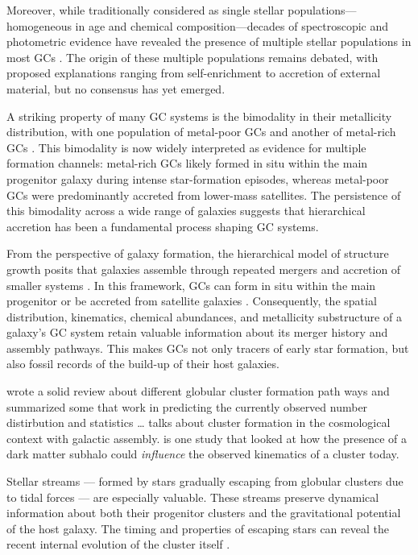     Moreover, while traditionally considered as single stellar populations—homogeneous in age and chemical composition—decades of spectroscopic and photometric evidence have revealed the presence of multiple stellar populations in most GCs \citep{2008MNRAS.391..825D,2012A&ARv..20...50G,2018ARA&A..56...83B}. The origin of these multiple populations remains debated, with proposed explanations ranging from self-enrichment to accretion of external material, but no consensus has yet emerged.

    A striking property of many GC systems is the bimodality in their metallicity distribution, with one population of metal-poor GCs and another of metal-rich GCs \citep[e.g.,][]{2006ARA&A..44..193B, 2015ApJ...806...36H}. This bimodality is now widely interpreted as evidence for multiple formation channels: metal-rich GCs likely formed in situ within the main progenitor galaxy during intense star-formation episodes, whereas metal-poor GCs were predominantly accreted from lower-mass satellites. The persistence of this bimodality across a wide range of galaxies suggests that hierarchical accretion has been a fundamental process shaping GC systems.

    From the perspective of galaxy formation, the hierarchical model of structure growth posits that galaxies assemble through repeated mergers and accretion of smaller systems \citep{2015ARA&A..53...51S}. In this framework, GCs can form in situ within the main progenitor or be accreted from satellite galaxies \citep[e.g.,][]{2018MNRAS.479.4760F,2020MNRAS.498.2472K,2023A&A...673A..86P,2024MNRAS.528.3198B,2025A&A...693A.155P}. Consequently, the spatial distribution, kinematics, chemical abundances, and metallicity substructure of a galaxy's GC system retain valuable information about its merger history and assembly pathways. This makes GCs not only tracers of early star formation, but also fossil records of the build-up of their host galaxies.
    

    \citet{2025arXiv250116438K} wrote a solid review about different globular cluster formation path ways and summarized some that work in predicting the currently observed number distirbution and statistics \dots
    \citet{2018RSPSA.47470616F} talks about cluster formation in the cosmological context with galactic assembly. 
    \citet{2022A&A...667A.112V} is one study that looked at how the presence of a dark matter subhalo could \textit{influence} the observed kinematics of a cluster today. 

    Stellar streams — formed by stars gradually escaping from globular clusters due to tidal forces — are especially valuable. These streams preserve dynamical information about both their progenitor clusters and the gravitational potential of the host galaxy. The timing and properties of escaping stars can reveal the recent internal evolution of the cluster itself \citep{1972ApJ...178..623T,1995AJ....109.2553G}. 

